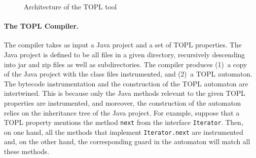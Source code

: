 \documentclass[9pt, preprint]{sigplanconf} %
\theoremstyle{definition}
\theoremstyle{remark}
\begin{document}
\begin{figure}[t]
\begin{center}

\caption{Architecture of the TOPL tool}
\label{architecture}
\end{center}
\end{figure}

\paragraph{The TOPL Compiler.} \label{sec:toplc} %
The compiler takes as input a Java project and a set of TOPL properties.
The Java project is defined to be all files in a given directory, recursively descending into jar and zip files as well as  subdirectories.
The compiler produces (1)~a copy of the Java project with the class files instrumented, and (2)~a TOPL automaton.
The bytecode instrumentation and the construction of the TOPL automaton are intertwined.
This is because only the Java methods relevant to the given TOPL properties are instrumented, and moreover,
 the construction of the  automaton relies on the inheritance tree of the Java project.
For example, suppose that a TOPL property mentions the method {\tt next} from the interface {\tt Iterator}.
Then, on one hand, all the methods that implement {\tt Iterator.next} are instrumented and, on the other hand, the corresponding guard in the automaton will match all these methods.
\end{document}
